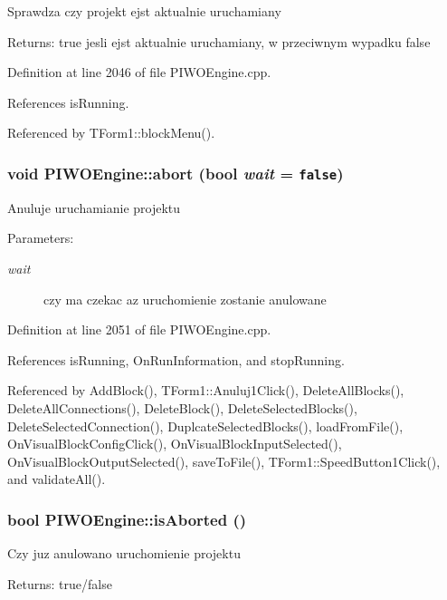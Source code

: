 Sprawdza czy projekt ejst aktualnie uruchamiany \begin{Desc}
\item[Returns:]true jesli ejst aktualnie uruchamiany, w przeciwnym wypadku false \end{Desc}


Definition at line 2046 of file PIWOEngine.cpp.

References isRunning.

Referenced by TForm1::blockMenu().\hypertarget{classPIWOEngine_134ab9db62730d3a680f24bf33068672}{
\subsubsection[abort]{\setlength{\rightskip}{0pt plus 5cm}void PIWOEngine::abort (bool {\em wait} = {\tt false})}}
\label{classPIWOEngine_134ab9db62730d3a680f24bf33068672}


Anuluje uruchamianie projektu \begin{Desc}
\item[Parameters:]
\begin{description}
\item[{\em wait}]czy ma czekac az uruchomienie zostanie anulowane \end{description}
\end{Desc}


Definition at line 2051 of file PIWOEngine.cpp.

References isRunning, OnRunInformation, and stopRunning.

Referenced by AddBlock(), TForm1::Anuluj1Click(), DeleteAllBlocks(), DeleteAllConnections(), DeleteBlock(), DeleteSelectedBlocks(), DeleteSelectedConnection(), DuplcateSelectedBlocks(), loadFromFile(), OnVisualBlockConfigClick(), OnVisualBlockInputSelected(), OnVisualBlockOutputSelected(), saveToFile(), TForm1::SpeedButton1Click(), and validateAll().\hypertarget{classPIWOEngine_8505bb4deb5c952d8f93d5b656f385cf}{
\subsubsection[isAborted]{\setlength{\rightskip}{0pt plus 5cm}bool PIWOEngine::isAborted ()}}
\label{classPIWOEngine_8505bb4deb5c952d8f93d5b656f385cf}


Czy juz anulowano uruchomienie projektu \begin{Desc}
\item[Returns:]true/false \end{Desc}


